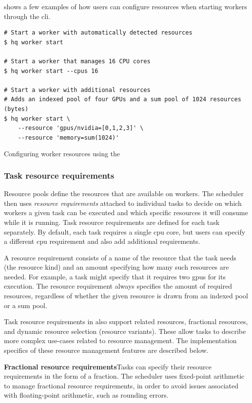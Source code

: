  shows a few examples of how users can configure resources
when starting workers through the \gls{cli}.

\begin{listing}[h]
	\begin{verbatim}
# Start a worker with automatically detected resources
$ hq worker start

# Start a worker that manages 16 CPU cores
$ hq worker start --cpus 16

# Start a worker with additional resources
# Adds an indexed pool of four GPUs and a sum pool of 1024 resources (bytes)
$ hq worker start \
	--resource 'gpus/nvidia=[0,1,2,3]' \
	--resource 'memory=sum(1024)'
	\end{verbatim}
	\caption{Configuring worker resources using the \hyperqueue{} }
	\label{lst:hq-cli-worker-resources}
\end{listing}

\subsubsection*{Task resource requirements}
Resource pools define the resources that are available on workers. The scheduler then uses
\emph{resource requirements} attached to individual tasks to decide on which workers a given task can be
executed and which specific resources it will consume while it is running. Task resource
requirements are defined for each task separately. By default, each task requires a single
\gls{cpu} core, but users can specify a different \gls{cpu} requirement
and also add additional requirements.

A resource requirement consists of a name of the resource that the task needs (the resource kind)
and an amount specifying how many such resources are needed. For example, a task might specify that
it requires two \glspl{gpu} for its execution. The resource requirement always
specifies the amount of required resources, regardless of whether the given resource is drawn from
an indexed pool or a sum pool.

Task resource requirements in \hyperqueue{} also support related resources, fractional
resources, and dynamic resource selection (resource variants). These allow tasks to describe more
complex use-cases related to resource management. The implementation specifics of these resource
management features are described below.

\vspace{2mm}\textbf{Fractional resource requirements}\enskip{}Tasks can specify
their resource requirements in the form of a fraction. The scheduler uses fixed-point arithmetic to
manage fractional resource requirements, in order to avoid issues associated with floating-point
arithmetic, such as rounding errors.

